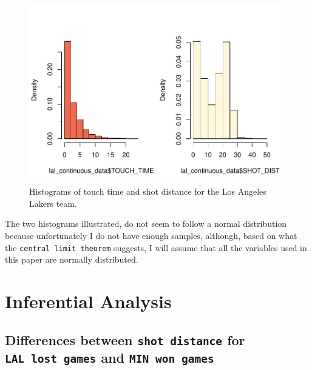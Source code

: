 \documentclass[
  11pt,
]{article}
\begin{document}
\begin{figure}

{\centering \includegraphics{index_files/figure-latex/histo-touch-time-shot-dist-1} 

}

\caption{Histograms of touch time and shot distance for the Los Angeles Lakers team.}\label{fig:histo-touch-time-shot-dist}
\end{figure}

The two histograms illustrated, do not seem to follow a normal distribution because unfortunately I do not have enough samples, although, based on what the \texttt{central\ limit\ theorem} suggests, I will assume that all the variables used in this paper are normally distributed.

\pagebreak

\hypertarget{inferential-analysis}{%
\section{Inferential Analysis}\label{inferential-analysis}}

\hypertarget{differences-between-shot-distance-for-lal-lost-games-and-min-won-games}{%
\subsection{\texorpdfstring{Differences between \texttt{shot\ distance} for \texttt{LAL\ lost\ games} and \texttt{MIN\ won\ games}}{Differences between shot distance for LAL lost games and MIN won games}}\label{differences-between-shot-distance-for-lal-lost-games-and-min-won-games}}
\end{document}
